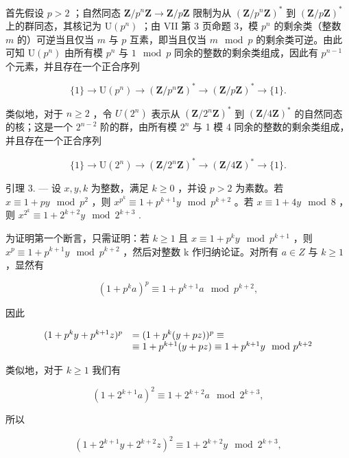 首先假设 \(p > 2\) ；自然同态 \(\mathbf{Z} / p^n\mathbf{Z} \to \mathbf{Z} / p\mathbf{Z}\) 限制为从 \((\mathbf{Z} / p^n\mathbf{Z})^*\) 到 \((\mathbf{Z} / p\mathbf{Z})^*\) 上的群同态，其核记为 \(\mathrm{U}(p^n)\) ；由 VII 第 3 页命题 3，模 \(p^n\) 的剩余类（整数 \(m\) 的）可逆当且仅当 \(m\) 与 \(p\) 互素，即当且仅当 \(m \mod p\) 的剩余类可逆。由此可知 \(\mathrm{U}(p^n)\) 由所有模 \(p^n\) 与 \(1 \mod p\) 同余的整数的剩余类组成，因此有 \(p^{n-1}\) 个元素，并且存在一个正合序列

\[
\{1 \} \rightarrow \mathrm{U} (p ^ {n}) \rightarrow (\mathbf {Z} / p ^ {n} \mathbf {Z}) ^ {*} \rightarrow (\mathbf {Z} / p \mathbf {Z}) ^ {*} \rightarrow \{1 \}.\tag{3}
\]

类似地，对于 \(n \geqslant 2\) ，令 \(U(2^n)\) 表示从 \((\mathbf{Z}/2^n\mathbf{Z})^*\) 到 \((\mathbf{Z}/4\mathbf{Z})^*\) 的自然同态的核；这是一个 \(2^{n-2}\) 阶的群，由所有模 \(2^n\) 与 1 模 4 同余的整数的剩余类组成，并且存在一个正合序列

\[
\{1 \} \rightarrow \mathrm{U} (2 ^ {n}) \rightarrow (\mathbf {Z} / 2 ^ {n} \mathbf {Z}) ^ {*} \rightarrow (\mathbf {Z} / 4 \mathbf {Z}) ^ {*} \rightarrow \{1 \}.\tag{4}
\]

引理 3. --- 设 \(x, y, k\) 为整数，满足 \(k \geqslant 0\) ，并设 \(p > 2\) 为素数。若 \(x \equiv 1 + py \mod p^2\) ，则 \(x^{p^k} \equiv 1 + p^{k+1}y \mod p^{k+2}\) 。若 \(x \equiv 1 + 4y \mod 8\) ，则 \(x^{2^k} \equiv 1 + 2^{k+2}y \mod 2^{k+3}\) .

为证明第一个断言，只需证明：若 \(k \geqslant 1\) 且 \(x \equiv 1 + p^{k}y \mod p^{k+1}\) ，则 \(x^{p} \equiv 1 + p^{k+1}y \mod p^{k+2}\) ，然后对整数 k 作归纳论证。对所有 \(a \in Z\) 与 \(k \geqslant 1\) ，显然有

\[
(1 + p ^ {k} a) ^ {p} \equiv 1 + p ^ {k + 1} a \mod p ^ {k + 2},
\]

因此

\[
\begin{array}{r l} (1 + p ^ {k} y + p ^ {k + 1} z) ^ {p} & = (1 + p ^ {k} (y + p z)) ^ {p} \equiv \\ & \equiv 1 + p ^ {k + 1} (y + p z) \equiv 1 + p ^ {k + 1} y \mod p ^ {k + 2} \end{array}
\]

类似地，对于 \(k \geqslant 1\) 我们有

\[
(1 + 2 ^ {k + 1} a) ^ {2} \equiv 1 + 2 ^ {k + 2} a \mod 2 ^ {k + 3},
\]

所以

\[
(1 + 2 ^ {k + 1} y + 2 ^ {k + 2} z) ^ {2} \equiv 1 + 2 ^ {k + 2} y \mod 2 ^ {k + 3},
\]

